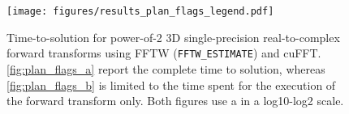 \begin{figure}[!htbp]
  \centering
  \texttt{[image: figures/results\_plan\_flags\_legend.pdf]}\vspace{-1em}
  \hfill
  \caption{Time-to-solution for power-of-2 3D single-precision real-to-complex forward transforms using FFTW (\texttt{FFTW\_ESTIMATE}) and cuFFT. \cref{fig:plan_flags_a} report the complete time to solution, whereas \cref{fig:plan_flags_b} is limited to the time spent for the execution of the forward transform only. Both figures use a in a log10-log2 scale.}
  \label{fig:fftw_plan_flags}
\end{figure}

